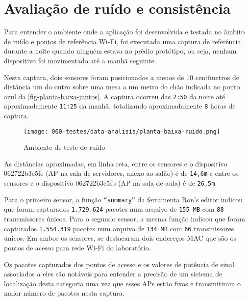 \section{Avaliação de ruído e consistência}
\label{sec:teste-ruido}

Para entender o ambiente onde a aplicação foi desenvolvida e testada no âmbito
de ruído e pontos de referência Wi-Fi, foi executada uma captura de referência
durante a noite quando ninguém estava no prédio protótipo, ou seja, nenhum
dispositivo foi movimentado até a manhã seguinte.

Nesta captura, dois sensores foram posicionados a menos de 10
centímetros de distância um do outro sobre uma mesa a um metro do chão indicada no ponto
azul da \autoref{fig-planta-baixa-juntos}. A captura
ocorreu das \texttt{2:50} da noite até aproximadamente \texttt{11:25} da manhã, totalizando
aproximadamente \texttt{8} horas de captura.

\begin{figure}[htb]
	\caption{\label{fig-planta-baixa-juntos}Ambiente de teste de ruído}
	\begin{center}
		\texttt{[image: 060-testes/data-analisis/planta-baixa-ruido.png]}
	\end{center}
\end{figure}

As distâncias aproximadas, em linha reta, entre os sensores e o dispositivo
062722b3e5fe (AP na sala de servidores, anexo ao salão) é de
\texttt{14,6m} e entre os sensores e o dispositivo
062722b3e5fb (AP na sala de aula) é de \texttt{26,5m}.

Para o primeiro sensor, a função \texttt{``summary''}  da ferramenta Ron’s editor
 indicou que foram capturados \texttt{1.729.624}
pacotes num arquivo de \texttt{155 MB} com \texttt{88} transmissores únicos.
Para o segundo sensor, a mesma função indicou que foram capturados \texttt{1.554.319}
pacotes num arquivo de \texttt{134 MB} com \texttt{66} transmissores únicos.
Em ambos os sensores, se destacaram dois endereços MAC que são os pontos de
acesso para rede Wi-Fi do laboratório.

Os pacotes capturados dos pontos de acesso e os valores de potência de sinal
associados a eles são notáveis para entender a precisão de um sistema de localização
desta categoria uma vez que esses APs estão fixos e transmitiram o
maior número de pacotes nesta captura.

